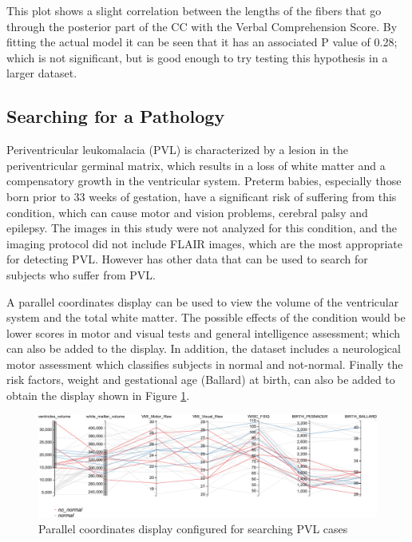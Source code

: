 \documentclass[twocolumn]{svjour3}
\begin{document}
This plot shows a slight correlation between the lengths of the fibers that go through the posterior part of the CC with the Verbal Comprehension Score. By fitting the actual model it can be seen that it has an associated P value of 0.28; which is not significant, but is good enough to try testing this hypothesis in a larger dataset.
  

\subsection{Searching for a Pathology}

Periventricular leukomalacia (PVL) is characterized by a lesion in the periventricular germinal matrix, which results in a loss of white matter and a compensatory growth in the ventricular system. Preterm babies, especially those born prior to 33 weeks of gestation, have a significant risk of suffering from this condition, which can cause motor and vision problems, cerebral palsy and epilepsy.    
The images in this study were not analyzed for this condition, and the imaging protocol did not include FLAIR images, which are the most appropriate for detecting PVL. However has other data that can be used to search for subjects who suffer from PVL.

A parallel coordinates display can be used to view the volume of the ventricular system and the total white matter. The possible effects of the condition would be lower scores in motor and visual tests and general intelligence assessment; which can also be added to the display. In addition, the dataset includes a neurological motor assessment which classifies subjects in normal and not-normal.  Finally the risk factors, weight and gestational age (Ballard) at birth, can also be added to obtain the display shown in Figure \ref{fig_parallel}.

\begin{figure}
\begin{center}
\includegraphics[width=\linewidth]{figures/cases/parallel_coordinates}
\end{center}
 \caption{\label{fig_parallel}Parallel coordinates display configured for searching PVL cases}
\end{figure}
\end{document}
